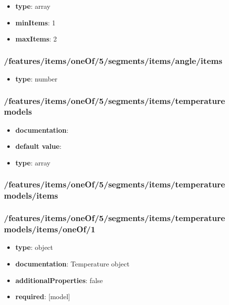 \begin{itemize}\item {\bf type}: array
\item {\bf minItems}: 1
\item {\bf maxItems}: 2
\end{itemize}\subsubsection{/features/items/oneOf/5/segments/items/angle/items}
\begin{itemize}\item {\bf type}: number
\end{itemize}\subsubsection{/features/items/oneOf/5/segments/items/temperature models}
\begin{itemize}\item {\bf documentation}: 
\item {\bf default value}: 
\item {\bf type}: array
\end{itemize}\subsubsection{/features/items/oneOf/5/segments/items/temperature models/items}

\subsubsection{/features/items/oneOf/5/segments/items/temperature models/items/oneOf/1}
\begin{itemize}\item {\bf type}: object
\item {\bf documentation}: Temperature object
\item {\bf additionalProperties}: false
\item {\bf required}: [model]\end{itemize}
